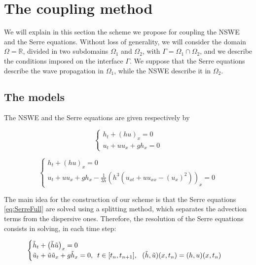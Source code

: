\section{The coupling method}

\indent We will explain in this section the scheme we propose for coupling the NSWE and the Serre equations. Without loss of generality, we will consider the domain $\Omega = \mathbb{R}$, divided in two subdomains $\Omega_1$ and $\Omega_2$, with $\Gamma = \Omega_1 \cap \Omega_2$, and we describe the conditions imposed on the interface $\Gamma$. We suppose that the Serre equations describe the wave propagation in $\Omega_1$, while the NSWE describe it in $\Omega_2$.

\subsection{The models}

\indent The NSWE and the Serre equations are given respectively by

\begin{equation}
\label{eq:nswe}
\begin{cases}
h_t + \left(hu\right)_x = 0 \\
u_t + uu_x + gh_x = 0
\end{cases}
\end{equation}

\begin{equation}
\label{eq:SerreFull}
\begin{cases}
h_t + (hu)_x = 0 \\
u_t + uu_x + gh_x - \frac{1}{3h}\left(h^3 \left( u_{xt} + uu_{xx} - (u_x)^2  \right) \right)_x = 0
\end{cases}
\end{equation}

\indent The main idea for the construction of our scheme is that the Serre equations \eqref{eq:SerreFull} are solved using a splitting method, which separates the advection terms from the dispersive ones. Therefore, the resolution of the Serre equations consists in solving, in each time step: 

\begin{equation}
\label{eq:SerreSplit1}
\begin{cases}
\th_t + \left(\th\tu\right)_x = 0 \\
\tu_t + \tu\tu_x + g\th_x = 0, \ \, t \in [t_n, t_{n+1}], \ \  (\th,\tu)(x,t_n) = (h,u)(x,t_n)
\end{cases}
\end{equation}

